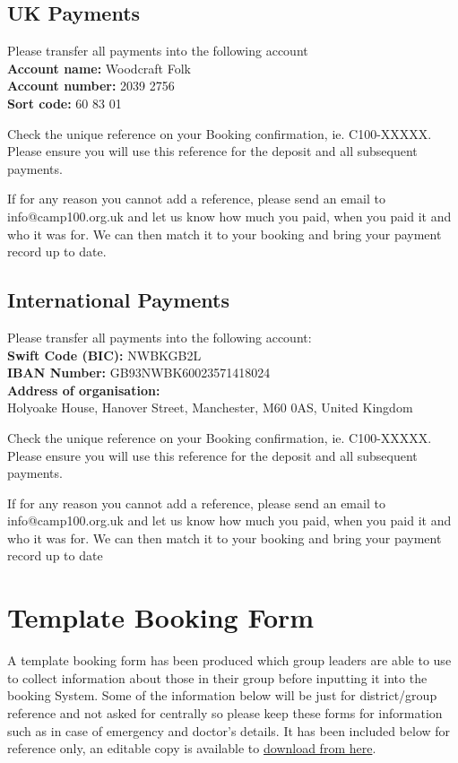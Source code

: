 \documentclass[a4paper, 11pt]{report}
\begin{document}
\section{UK Payments}

Please transfer all payments into the following account\\
\textbf{Account name:} Woodcraft Folk\\
\textbf{Account number:} 2039 2756\\
\textbf{Sort code:} 60 83 01

Check the unique reference on your Booking confirmation, ie. C100-XXXXX. Please ensure you will use this reference for the deposit and all subsequent payments.

If for any reason you cannot add a reference, please send an email to info@camp100.org.uk and let us know how much you paid, when you paid it and who it was for. We can then match it to your booking and bring your payment record up to date.

\section{International Payments}

Please transfer all payments into the following account:\\
\textbf{Swift Code (BIC):} NWBKGB2L\\
\textbf{IBAN Number:} GB93NWBK60023571418024\\
\textbf{Address of organisation:} \\
Holyoake House, Hanover Street, Manchester, M60 0AS, United Kingdom

Check the unique reference on your Booking confirmation, ie. C100-XXXXX. Please ensure you will use this reference for the deposit and all subsequent payments. 

If for any reason you cannot add a reference, please send an email to info@camp100.org.uk and let us know how much you paid, when you paid it and who it was for. We can then match it to your booking and bring your payment record up to date


\chapter{Template Booking Form}
\label{chap:template-booking-form}

A template booking form has been produced which group leaders are able to use to collect information about those in their group before inputting it into the booking System. Some of the information below will be just for district/group reference and not asked for centrally so please keep these forms for information such as in case of emergency and doctor’s details.  It has been included below for reference only, an editable copy is available to \href{https://drive.google.com/file/d/1oSFIkZQxzes3VTi5ZqPHCcAu4DiscvOm/view}{download from here}. 



\makedocumentbackpage
\end{document}
